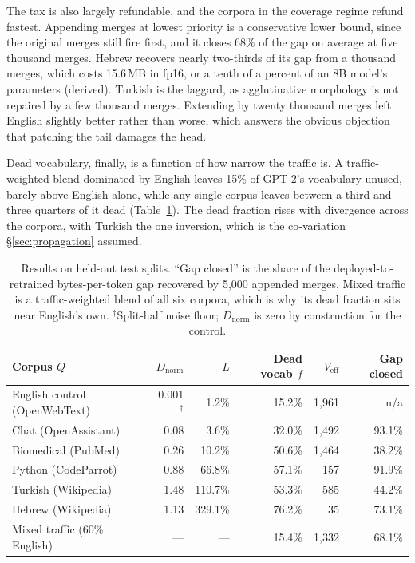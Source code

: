 \documentclass{article}
\begin{document}
The tax is also largely refundable, and the corpora in the coverage regime refund fastest. Appending merges at lowest priority is a conservative lower bound, since the original merges still fire first, and it closes 68\% of the gap on average at five thousand merges. Hebrew recovers nearly two-thirds of its gap from a thousand merges, which costs 15.6\,MB in fp16, or a tenth of a percent of an 8B model's parameters (derived). Turkish is the laggard, as agglutinative morphology is not repaired by a few thousand merges. Extending by twenty thousand merges left English slightly better rather than worse, which answers the obvious objection that patching the tail damages the head.

Dead vocabulary, finally, is a function of how narrow the traffic is. A traffic-weighted blend dominated by English leaves 15\% of GPT-2's vocabulary unused, barely above English alone, while any single corpus leaves between a third and three quarters of it dead (Table~\ref{tab:results}). The dead fraction rises with divergence across the corpora, with Turkish the one inversion, which is the co-variation \S\ref{sec:propagation} assumed.

\begin{table}[t]
\centering
\small
\begin{tabular}{@{}lrrrrr@{}}
\toprule
Corpus $Q$ & $D_{\mathrm{norm}}$ & $L$ & Dead vocab $f$ & $V_{\mathrm{eff}}$ & Gap closed \\
\midrule
English control (OpenWebText) & 0.001$^{\dagger}$ & 1.2\% & 15.2\% & 1{,}961 & n/a \\
Chat (OpenAssistant) & 0.08 & 3.6\% & 32.0\% & 1{,}492 & 93.1\% \\
Biomedical (PubMed) & 0.26 & 10.2\% & 50.6\% & 1{,}464 & 38.2\% \\
Python (CodeParrot) & 0.88 & 66.8\% & 57.1\% & 157 & 91.9\% \\
Turkish (Wikipedia) & 1.48 & 110.7\% & 53.3\% & 585 & 44.2\% \\
Hebrew (Wikipedia) & 1.13 & 329.1\% & 76.2\% & 35 & 73.1\% \\
\midrule
Mixed traffic (60\% English) & --- & --- & 15.4\% & 1{,}332 & 68.1\% \\
\bottomrule
\end{tabular}
\caption{Results on held-out test splits. ``Gap closed'' is the share of the deployed-to-retrained bytes-per-token gap recovered by 5{,}000 appended merges. Mixed traffic is a traffic-weighted blend of all six corpora, which is why its dead fraction sits near English's own. $^{\dagger}$Split-half noise floor; $D_{\mathrm{norm}}$ is zero by construction for the control.}
\label{tab:results}
\end{table}
\end{document}
